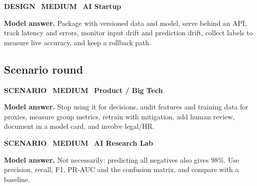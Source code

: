 \documentclass[11pt]{article}
\begin{document}
\begin{tcolorbox}[enhanced,breakable,colback=white,colframe=crimson,arc=2mm,boxrule=0.8pt,left=3mm,right=3mm,
 title={\textbf{QV.12}\quad How would you deploy and monitor a model in production?},fonttitle=\color{white}\small,colbacktitle=crimson]
\colorbox{crimson!15}{\scriptsize\bfseries\color{crimson} DESIGN}\
\colorbox{gold!85!black!15}{\scriptsize\bfseries\color{gold!85!black} MEDIUM}\
\colorbox{navy!8}{\scriptsize\bfseries\color{navy} AI Startup}\par\smallskip
\textbf{\color{navy}Model answer.} Package with versioned data and model, serve behind an API, track latency and errors, monitor input drift and prediction drift, collect labels to measure live accuracy, and keep a rollback path.
\end{tcolorbox}
\subsection*{\color{leaf}Scenario round}
\begin{tcolorbox}[enhanced,breakable,colback=white,colframe=leaf,arc=2mm,boxrule=0.8pt,left=3mm,right=3mm,
 title={\textbf{QV.13}\quad A hiring model rates women lower for the same CV. What do you do?},fonttitle=\color{white}\small,colbacktitle=leaf]
\colorbox{leaf!15}{\scriptsize\bfseries\color{leaf} SCENARIO}\
\colorbox{gold!85!black!15}{\scriptsize\bfseries\color{gold!85!black} MEDIUM}\
\colorbox{navy!8}{\scriptsize\bfseries\color{navy} Product / Big Tech}\par\smallskip
\textbf{\color{navy}Model answer.} Stop using it for decisions, audit features and training data for proxies, measure group metrics, retrain with mitigation, add human review, document in a model card, and involve legal/HR.
\end{tcolorbox}
\begin{tcolorbox}[enhanced,breakable,colback=white,colframe=leaf,arc=2mm,boxrule=0.8pt,left=3mm,right=3mm,
 title={\textbf{QV.14}\quad Your model is 98\% accurate on a dataset with 2\% positives. Is it good?},fonttitle=\color{white}\small,colbacktitle=leaf]
\colorbox{leaf!15}{\scriptsize\bfseries\color{leaf} SCENARIO}\
\colorbox{gold!85!black!15}{\scriptsize\bfseries\color{gold!85!black} MEDIUM}\
\colorbox{navy!8}{\scriptsize\bfseries\color{navy} AI Research Lab}\par\smallskip
\textbf{\color{navy}Model answer.} Not necessarily: predicting all negatives also gives 98\%. Use precision, recall, F1, PR-AUC and the confusion matrix, and compare with a baseline.
\end{tcolorbox}
\end{document}
